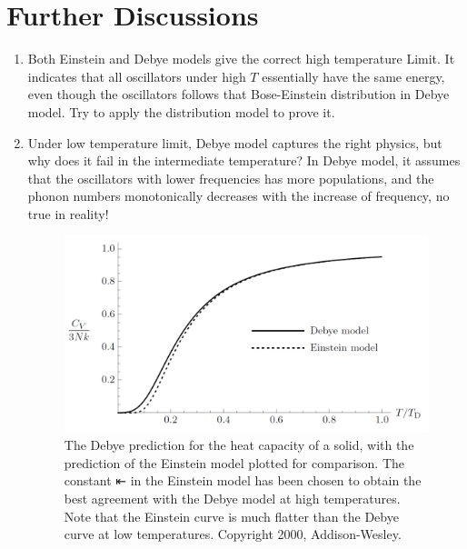 \section{Further Discussions}
\begin{enumerate}
\item{Both Einstein and Debye models give the correct high temperature Limit. It indicates that all oscillators under high $T$ essentially have the same energy, even though the oscillators follows that Bose-Einstein distribution in Debye model. Try to apply the distribution model to prove it.}
\item{Under low temperature limit, Debye model captures the right physics, but why does it fail in the intermediate temperature? In Debye model, it assumes that the
oscillators with lower frequencies has more populations, and the phonon numbers monotonically decreases with the increase of frequency, no true in reality!}


\begin{figure}[h]
\centering
\includegraphics[width=0.9\linewidth]{imgs/Debye.png}
\caption{The Debye prediction for the heat capacity of a solid, with the
prediction of the Einstein model plotted for comparison. The constant ⇤ in the
Einstein model has been chosen to obtain the best agreement with the Debye
model at high temperatures. Note that the Einstein curve is much flatter than the Debye curve at low temperatures. Copyright 2000, Addison-Wesley. }
\end{figure}

\end{enumerate}



